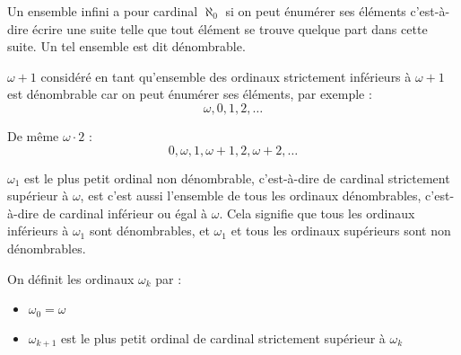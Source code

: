 \documentclass[12pt]{beamer}
\begin{document}
\begin{frame}

Un ensemble infini a pour cardinal $\aleph_0$ si on peut énumérer ses éléments c'est-à-dire écrire une suite telle que tout élément se trouve quelque part dans cette suite. Un tel ensemble est dit dénombrable.

\( \omega+1 \) considéré en tant qu'ensemble des ordinaux strictement inférieurs à \( \omega+1 \) est dénombrable car on peut énumérer ses éléments, par exemple :
\[ \omega, 0, 1, 2, \ldots \]

De même \( \omega \cdot 2 \) :
\[ 0, \omega, 1, \omega+1, 2, \omega+2, \ldots \]

\end{frame}
\begin{frame}

\( \omega_1 \) est le plus petit ordinal non dénombrable, c'est-à-dire de cardinal strictement supérieur à \( \omega \), est c'est aussi l'ensemble de tous les ordinaux dénombrables, c'est-à-dire de cardinal inférieur ou égal à \( \omega \). Cela signifie que tous les ordinaux inférieurs à \( \omega_1 \) sont dénombrables, et \( \omega_1 \) et tous les ordinaux supérieurs sont non dénombrables.

\medskip

On définit les ordinaux \( \omega_k \) par :

\begin{itemize}
     \setlength{\itemsep}{1pt}
     \setlength{\parskip}{0pt}
     \setlength{\parsep}{0pt}
\item \( \omega_0 = \omega \)
\item \( \omega_{k+1} \) est le plus petit ordinal de cardinal strictement supérieur à \( \omega_k \)
\end{itemize}

\end{frame}

\begin{comment}
\begin{frame}

Un ordinal est aussi un cardinal si c'est le cardinal de certains ordinaux (dont lui-même) autrement dit s'il n'existe pas d'ordinal plus petit ayant le même cardinal, ou si son cardinal est égal à lui-même.
Par exemple, \( \omega \) est un cardinal, mais \( \omega+1 \) n'est pas un cardinal, car son cardinal est \( \omega \), il a donc le même cardinal que \( \omega \) qui lui est inférieur.

\end{frame}
\end{comment}
\end{document}
